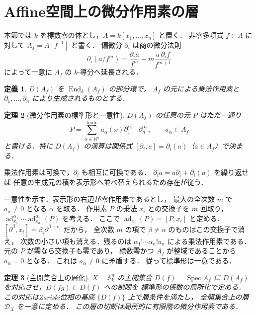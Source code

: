 \documentclass[a5paper,10pt,onecolumn]{jsarticle}
\makeatletter
\theoremstyle{mathnotetheorem}
\newtheorem{theorem}{定理}[section]
\newtheorem{definition}[theorem]{定義}
\renewcommand{\proofname}{証明}
\renewenvironment{proof}[1][\proofname]{%
  \par\pushQED{\qed}\normalfont\topsep4\p@\@plus2\p@\relax
  \trivlist\item[\hskip\labelsep\bfseries #1]\ignorespaces
}{\popQED\endtrivlist\@endpefalse}
\makeatother
\begin{document}
\section{Affine空間上の微分作用素の層}
本節では $k$ を標数零の体とし，$A=k[x_1,\ldots,x_n]$ と置く．
非零多項式 $f\in A$ に対して $A_f=A[f^{-1}]$ と書く．
偏微分 $\partial_i$ は商の微分法則
\[
 \partial_i(a/f^m)=\frac{\partial_i a}{f^m}
 -m\frac{a\,\partial_i f}{f^{m+1}}
\]
によって一意に $A_f$ の $k$-導分へ延長される．
\begin{definition}
$D(A_f)$ を $\operatorname{End}_k(A_f)$ の部分環で，
$A_f$ の元による乗法作用素と $\partial_1,\ldots,\partial_n$
により生成されるものとする．
\end{definition}
\begin{theorem}[微分作用素の標準形と一意性]
$D(A_f)$ の任意の元 $P$ はただ一通り
\[
 P=\sum_{\alpha\in\mathbb N^n}^{\mathrm{finite}}
 a_\alpha(x)\partial_1^{\alpha_1}\cdots\partial_n^{\alpha_n},
 \qquad a_\alpha\in A_f
\]
と書ける．特に $D(A_f)$ の演算は関係式
$[\partial_i,a]=\partial_i(a)$（$a\in A_f$）で決まる．
\end{theorem}
\begin{proof}
乗法作用素は可換で，$\partial_i$ も相互に可換である．
$\partial_i a=a\partial_i+\partial_i(a)$ を繰り返せば
任意の生成元の積を表示形へ並べ替えられるため存在が従う．

一意性を示す．表示形の右辺が零作用素であるとし，
最大の全次数 $m$ で $a_\alpha\ne0$ となる $\alpha$ を取る．
作用素 $P$ の乗法 $x_i$ との交換子を $m$ 回取り，
$\operatorname{ad}_{x_1}^{\alpha_1}\cdots
 \operatorname{ad}_{x_n}^{\alpha_n}(P)$ を考える．
ここで $\operatorname{ad}_{x_i}(P)=[P,x_i]$ と定める．
$[\partial^\beta,x_i]=\beta_i\partial^{\beta-e_i}$ だから，
全次数 $m$ の項で $\beta\ne\alpha$ のものはこの交換子で消え，
次数の小さい項も消える．残るのは
$\alpha_1!\cdots\alpha_n!a_\alpha$ による乗法作用素である．
元の $P$ が零なら交換子も零であり，
標数零かつ $A_f$ が整域であることから $a_\alpha=0$ となる．
これは $a_\alpha\ne0$ に矛盾する．
従って標準形は一意である．
\end{proof}
\begin{theorem}[主開集合上の層化]
$X=\mathbb A_k^n$ の主開集合 $D(f)=\operatorname{Spec}A_f$ に
$D(A_f)$ を対応させ，$D(fg)\subset D(f)$ への制限を
標準形の係数の局所化で定める．
この対応はZariski位相の基底 $\{D(f)\}$ 上で層条件を満たし，
全開集合上の層 $\mathcal D_X$ を一意に定める．
この層の切断は局所的に有限階の微分作用素である．
\end{theorem}
\end{document}
